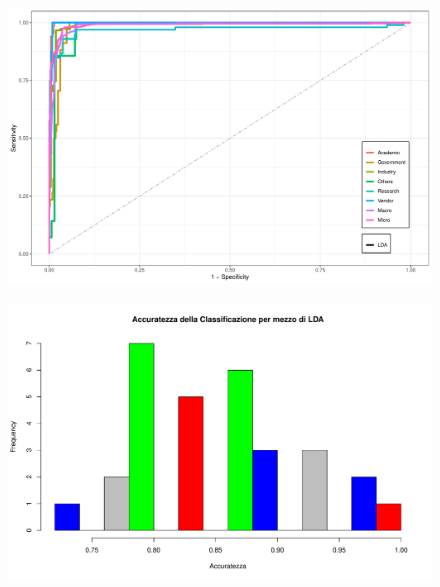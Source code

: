 \documentclass[11pt,a4paper]{article}
\begin{document}
\begin{figure}[H]
	\hspace{-2.5cm}
	\includegraphics[scale=.75]{imgs/LDA_ggplot.pdf}
\end{figure}
\begin{figure}[H]
	\hspace{-2.5cm}
	\includegraphics[scale=.75]{imgs/LDA_hist.pdf}
\end{figure}
\end{document}
